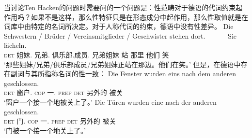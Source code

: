 当讨论Ten Hacken的问题时需要问的一个问题是：性范畴对于德语的代词约束起作用吗？如果不是这样，那么性特征只是在形态成分中起作用，那么性取值就是在词库中由特定的名词所决定。对于人称代词的约束，德语中没有性差异。
\ea
\gll Die Schwestern / Brüder / Vereinsmitglieder / Geschwister stehen dort.~~~~~~ Sie lächeln.\\
     \textsc{det} 姐妹.\fem{} {} 兄弟.\mas{} {} 俱乐部.成员.\neu{} {} 兄弟姐妹 站 那里 他们 笑\\
\glt `那些姐妹/兄弟/俱乐部成员/兄弟姐妹正站在那边。他们在笑。'
\z
但是，在德语中存在副词与其所指称名词的性一致\citep[\S~6]{Hoehle83}：
\eal
\label{Beispiel-einer-nach-dem-anderen}
\ex
\gll Die Fenster wurden eins nach dem anderen geschlossen.\\
	 \textsc{det} 窗户.\neu{}  \textsc{cop} 一.\neu{} \textsc{prep} \textsc{det} 另外的 被关\\
\glt `窗户一个接一个地被关上了。'
\ex 
\gll Die Türen wurden eine nach der anderen geschlossen.\\
	\textsc{det} 门.\fem{} \textsc{cop} 一.\fem{} \textsc{prep} \textsc{det} 另外的 被关\\
\glt `门被一个接一个地关上了。'
